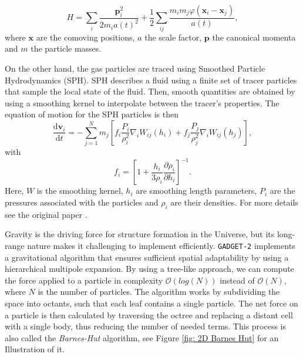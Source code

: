 \begin{equation}
        H=\sum_i\frac{\boldsymbol{p}_i^2}{2 m_i a(t)^2}+\frac12\sum_{ij}\frac{m_im_j \varphi(\boldsymbol{x}_i-\boldsymbol{x}_j)}{a(t)},
\end{equation}
where $\boldsymbol{x}$ are the comoving positions, $a$ the scale factor, $\boldsymbol{p}$ the canonical momenta and $m$ the particle masses.

On the other hand, the gas particles are traced using Smoothed Particle Hydrodynamics (SPH). SPH describes a fluid using a finite set of tracer particles that sample the local state of the fluid. Then, smooth quantities are obtained by using a smoothing kernel to interpolate between the tracer's properties. The equation of motion for the SPH particles is then
\begin{equation}
        \frac{\mathrm{d}\boldsymbol{v}_i}{\mathrm{d}t}=-\sum_{j=1}^Nm_j\left[f_i\frac{P_i}{\rho_i^2}\nabla_iW_{ij}(h_i)+f_j\frac{P_j}{\rho_j^2}\nabla_iW_{ij}(h_j)\right],
\end{equation}
with
\begin{equation}
        f_i=\left[1+\frac{h_i}{3\rho_i}\frac{\partial\rho_i}{\partial h_i}\right]^{-1}.
\end{equation}
Here, $W$ is the smoothing kernel, $h_i$ are smoothing length parameters, $P_i$ are the pressures associated with the particles and $\rho_i$ are their densities. For more details see the original paper \cite{Springel_2005}.



Gravity is the driving force for structure formation in the Universe, but its long-range nature makes it challenging to implement efficiently. \texttt{GADGET-2} implements a gravitational algorithm that ensures sufficient spatial adaptability by using a hierarchical multipole expansion. By using a tree-like approach, we can compute the force applied to a particle in complexity $\mathcal{O}(log(N))$ instead of $\mathcal{O}(N)$, where $N$ is the number of particles. The algorithm works by subdividing the space into octants, such that each leaf contains a single particle. The net force on a particle is then calculated by traversing the octree and replacing a distant cell with a single body, thus reducing the number of needed terms. This process is also called the \emph{Barnes-Hut} algorithm, see Figure \ref{fig: 2D Barnes Hut} for an Illustration of it.

